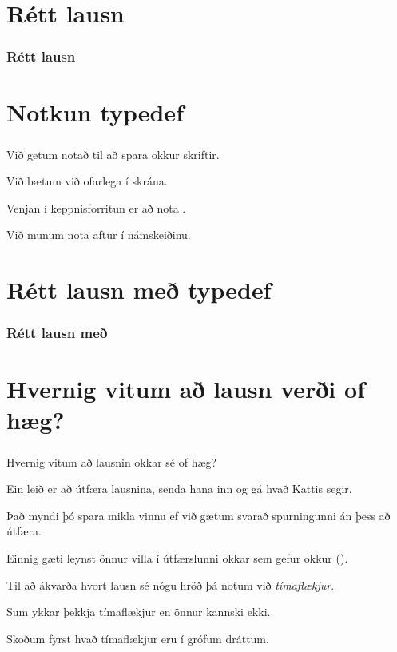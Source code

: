 \section{Rétt lausn}
{
    \frametitle{Rétt lausn}
}

\section{Notkun typedef}
{
    \frametitle{}
    {
        \item<1-> Við getum notað  til að spara okkur skriftir.
        \item<2-> Við bætum við  ofarlega í skrána.
        \item<3-> Venjan í keppnisforritun er að nota .
        \item<4-> Við munum nota  aftur í námskeiðinu.
    }
}

\section{Rétt lausn með typedef}
{
    \frametitle{Rétt lausn með }
}

\section{Hvernig vitum að lausn verði of hæg?}
{
    \frametitle{}
    {
        \item<1-> Hvernig vitum að lausnin okkar sé of hæg?
        \item<2-> Ein leið er að útfæra lausnina, senda hana inn og gá hvað Kattis segir.
        \item<3-> Það myndi þó spara mikla vinnu ef við gætum svarað spurningunni án þess að útfæra.
        \item<4-> Einnig gæti leynst önnur villa í útfærslunni okkar sem gefur okkur  ().
        \item<5-> Til að ákvarða hvort lausn sé nógu hröð þá notum við \emph{tímaflækjur}.
        \item<6-> Sum ykkar þekkja tímaflækjur en önnur kannski ekki.
        \item<7-> Skoðum fyrst hvað tímaflækjur eru í grófum dráttum.
    }
}


